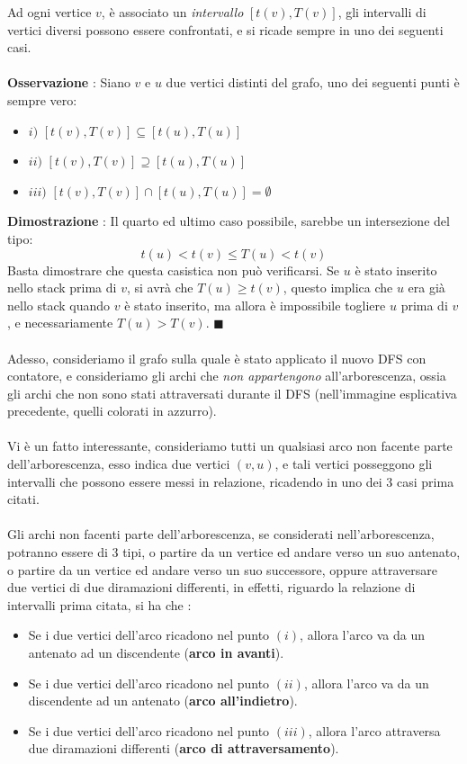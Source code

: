 \documentclass[12pt, letterpaper]{article}
\newcommand{\acc}{\\\hphantom{}\\}
\begin{document}
Ad ogni vertice \(v\), è associato un \textit{intervallo} \([t(v),T(v)]\), gli intervalli di vertici diversi possono
essere confrontati, e si ricade sempre in uno dei seguenti casi.\acc
\textbf{Osservazione} : Siano \(v\) e \(u\) due vertici distinti del grafo, uno dei seguenti punti è sempre vero:\begin{itemize}
    \item \(i)\) $[t(v),T(v)]\subseteq[t(u),T(u)]$
    \item \(ii)\) $[t(v),T(v)]\supseteq[t(u),T(u)]$
    \item \(iii)\) $[t(v),T(v)]\cap[t(u),T(u)]=\emptyset$
\end{itemize}
\textbf{Dimostrazione} : Il quarto ed ultimo caso possibile, sarebbe un intersezione del tipo: $$
    t(u)<t(v)\le T(u)<t(v)$$ Basta dimostrare che questa casistica non può verificarsi. Se \(u\) è stato inserito
nello stack prima di \(v\), si avrà che \(T(u)\ge t(v)\), questo implica che \(u\) era già nello stack quando
\(v\) è stato inserito, ma allora è impossibile togliere \(u\) prima di \(v\), e necessariamente \(T(u)>T(v)\). \(\blacksquare\)\acc
Adesso, consideriamo il grafo sulla quale è stato applicato il nuovo DFS con contatore, e consideriamo gli archi che \textit{non appartengono}
all'arborescenza, ossia gli archi che non sono stati attraversati durante il DFS (nell'immagine esplicativa precedente, quelli colorati in
azzurro). \acc
Vi è un fatto interessante, consideriamo tutti un qualsiasi arco non facente parte dell'arborescenza, esso indica due vertici \((v,u)\),
e tali vertici posseggono gli intervalli che possono essere messi in relazione, ricadendo in uno dei 3 casi prima citati.\acc Gli archi
non facenti parte dell'arborescenza, se considerati nell'arborescenza, potranno essere di 3 tipi, o partire da un vertice ed andare
verso un suo antenato, o partire da un vertice ed andare
verso un suo successore, oppure attraversare due vertici di due diramazioni differenti, in effetti, riguardo la relazione
di intervalli prima citata, si ha che : \begin{itemize}
    \item Se i due vertici dell'arco ricadono nel punto \((i)\), allora l'arco va da un antenato ad un discendente (\textbf{arco in avanti}).
    \item Se i due vertici dell'arco ricadono nel punto \((ii)\), allora l'arco va da un discendente ad un antenato  (\textbf{arco all'indietro}).
    \item Se i due vertici dell'arco ricadono nel punto \((iii)\), allora l'arco attraversa due diramazioni differenti  (\textbf{arco di attraversamento}).
\end{itemize}
\end{document}
